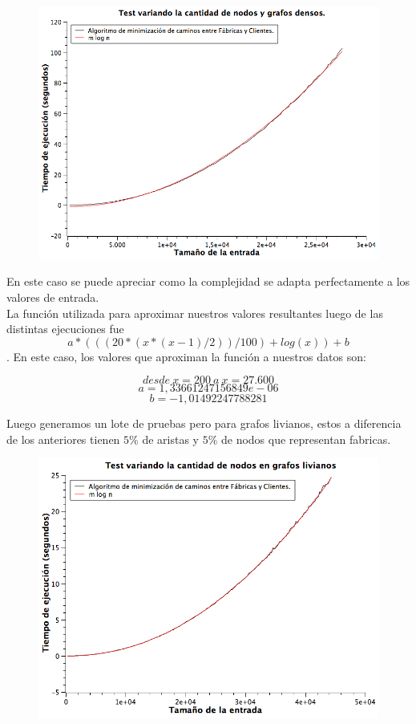 \begin{figure}[H]
	\includegraphics[width=400pt]{../tests/ej3/EJ3-nodo-var-denso.png}
\end{figure}

En este caso se puede apreciar como la complejidad se adapta perfectamente a los valores de entrada.\\
La función utilizada para aproximar nuestros valores resultantes luego de las distintas ejecuciones fue $$a*(((20*(x*(x-1)/2)) / 100) + log(x)) + b$$.
En este caso, los valores que aproximan la función a nuestros datos son:

$$desde\ x = 200\ a\ x = 27.600 $$
$$a  = 1,33661247156849e-06$$
$$b  = -1,01492247788281 $$

\newpage
Luego generamos un lote de pruebas pero para grafos livianos, estos a diferencia de los anteriores tienen $5\%$ de aristas y $5\%$ de nodos que representan fabricas.

\begin{figure}[H]
	\includegraphics[width=400pt]{../tests/ej3/EJ3-nodo-var-liviano.png}
\end{figure}

